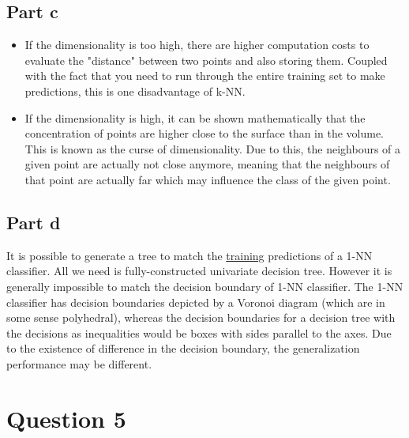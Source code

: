 \documentclass{article}
\begin{document}
\subsection*{Part c}
\begin{flushleft}
\begin{itemize}
\item If the dimensionality is too high, there are higher computation costs to evaluate the "distance" between two points and also storing them. Coupled with the fact that you need to run through the entire training set to make predictions, this is one disadvantage of k-NN.
\item If the dimensionality is high, it can be shown mathematically that the concentration of points are higher close to the surface than in the volume. This is known as the curse of dimensionality. Due to this, the neighbours of a given point are actually not close anymore, meaning that the neighbours of that point are actually far which may influence the class of the given point.
\end{itemize}
\end{flushleft}

\subsection*{Part d}
\begin{flushleft}
It is possible to generate a tree to match the \underline{training} predictions of a 1-NN classifier. All we need is fully-constructed univariate decision tree. However it is generally impossible to match the decision boundary of 1-NN classifier. The 1-NN classifier has decision boundaries depicted by a Voronoi diagram (which are in some sense polyhedral), whereas the decision boundaries for a decision tree with the decisions as inequalities would be boxes with sides parallel to the axes. Due to the existence of difference in the decision boundary, the generalization performance may be different.
\end{flushleft}

\section*{Question 5}
\end{document}
